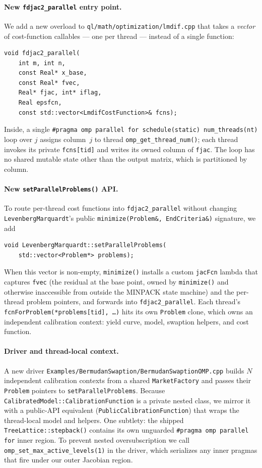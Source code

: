 \documentclass[11pt,twocolumn]{article}
\begin{document}
\paragraph{New \texttt{fdjac2\_parallel} entry point.}
We add a new overload to \texttt{ql/math/optimization/lmdif.cpp}
that takes a \emph{vector} of cost-function callables ---
one per thread --- instead of a single function:
\begin{lstlisting}
void fdjac2_parallel(
    int m, int n,
    const Real* x_base,
    const Real* fvec,
    Real* fjac, int* iflag,
    Real epsfcn,
    const std::vector<LmdifCostFunction>& fcns);
\end{lstlisting}
Inside, a single \texttt{\#pragma omp parallel for schedule(static)
num\_threads(nt)} loop over $j$ assigns column~$j$ to thread
\texttt{omp\_get\_thread\_num()}; each thread invokes its private
\texttt{fcns[tid]} and writes its owned column of \texttt{fjac}.
The loop has no shared mutable state other than the output matrix,
which is partitioned by column.

\paragraph{New \texttt{setParallelProblems()} API.}
To route per-thread cost functions into \texttt{fdjac2\_parallel}
without changing \texttt{LevenbergMarquardt}'s public
\texttt{minimize(Problem\&, EndCriteria\&)} signature, we add
\begin{lstlisting}
void LevenbergMarquardt::setParallelProblems(
    std::vector<Problem*> problems);
\end{lstlisting}
When this vector is non-empty, \texttt{minimize()} installs a custom
\texttt{jacFcn} lambda that captures \texttt{fvec} (the residual at
the base point, owned by \texttt{minimize()} and otherwise
inaccessible from outside the MINPACK state machine) and the
per-thread problem pointers, and forwards into
\texttt{fdjac2\_parallel}.  Each thread's
\texttt{fcnForProblem(*problems[tid], \ldots)} hits its own
\texttt{Problem} clone, which owns an independent calibration
context: yield curve, model, swaption helpers, and cost function.

\paragraph{Driver and thread-local context.}
A new driver
\texttt{Examples/BermudanSwaption/BermudanSwaptionOMP.cpp}
builds $N$ independent calibration contexts from a shared
\texttt{MarketFactory} and passes their \texttt{Problem} pointers
to \texttt{setParallelProblems}.  Because
\texttt{CalibratedModel::CalibrationFunction} is a private nested
class, we mirror it with a public-API equivalent
(\texttt{PublicCalibrationFunction}) that wraps the thread-local
model and helpers.  One subtlety: the shipped
\texttt{TreeLattice::stepback()} contains its own unguarded
\texttt{\#pragma omp parallel for} inner region.  To prevent nested
oversubscription we call \texttt{omp\_set\_max\_active\_levels(1)}
in the driver, which serializes any inner pragmas that fire under
our outer Jacobian region.
\end{document}
